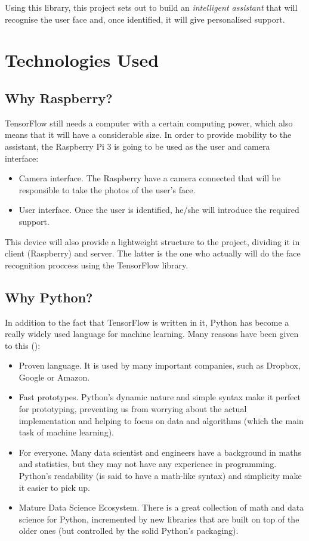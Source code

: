 Using this library, this project sets out to build an \textit{intelligent assistant} that will recognise the user face and, once identified, it will give personalised support. 


\section{Technologies Used}	
	\subsection{Why Raspberry?}
	TensorFlow still needs a computer with a certain computing power, which also means that it will have a considerable size. In order to provide mobility to the assistant, the Raspberry Pi 3 is going to be used as the user and camera interface:

	\begin{itemize}
		\item Camera interface. The Raspberry have a camera connected that will be responsible to take the photos of the user's face.
		\item User interface. Once the user is identified, he/she will introduce the required support.
	\end{itemize}

	This device will also provide a lightweight structure to the project, dividing it in client (Raspberry) and server. The latter is the one who actually will do the face recognition proccess using the TensorFlow library.

	\subsection{Why Python?}
	In addition to the fact that TensorFlow is written in it, Python has become a really widely used language for machine learning. Many reasons have been given to this (\cite{why_python}):

	\begin{itemize}
		\item Proven language. It is used by many important companies, such as Dropbox, Google or Amazon. 
		\item Fast prototypes. Python's dynamic nature and simple syntax make it perfect for prototyping, preventing us from worrying about the actual implementation and helping to focus on data and algorithms (which the main task of machine learning).
		\item For everyone. Many data scientist and engineers have a background in maths and statistics, but they may not have any experience in programming. Python's readability (is said to have a math-like syntax) and simplicity make it easier to pick up.
		\item Mature Data Science Ecosystem. There is a great collection of math and data science for Python, incremented by new libraries that are built on top of the older ones (but controlled by the solid Python's packaging). 
	\end{itemize}


